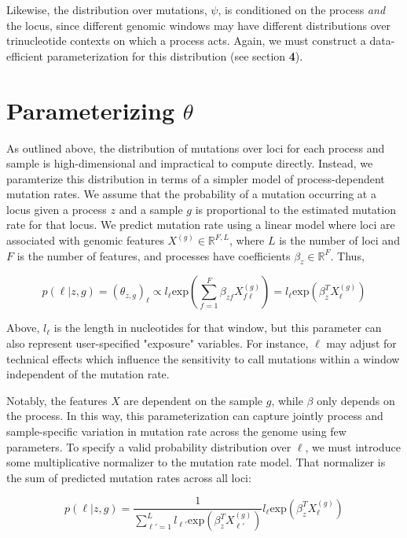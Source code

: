 \documentclass{article}
\begin{document}
Likewise, the distribution over mutations, $\psi$, is conditioned on the process \emph{and} the locus, since different genomic windows may have different 
distributions over trinucleotide contexts on which a process acts. Again, we must construct a data-efficient parameterization for this distribution (see section \textbf{4}).


\section{Parameterizing $\theta$}

As outlined above, the distribution of mutations over loci for each process and sample is high-dimensional and impractical to compute directly. Instead, we paramterize this
distribution in terms of a simpler model of process-dependent mutation rates. We assume that the probability of a mutation occurring at a locus given a process $z$ and a sample $g$ is proportional to the estimated mutation rate for that locus. We predict mutation rate using a linear model where loci are associated with genomic features $X^{(g)} \in \mathbb{R}^{F,L}$, where $L$ is the number of loci and $F$ is the number of features, and processes have coefficients $\beta_z \in \mathbb{R}^{F}$. Thus, 

\begin{equation} \label{3}
p(\ell | z, g) = (\theta_{z,g})_\ell \propto l_\ell  \textrm{exp}(\sum_{f=1}^{F}\beta_{zf} X^{(g)}_{f\ell}) = l_\ell \textrm{exp}(\beta_z^T X^{(g)}_\ell)
\end{equation}

Above, $l_\ell$ is the length in nucleotides for that window, but this parameter can also represent user-specified "exposure" variables. For instance, $\ell$ may adjust for technical effects which influence the sensitivity to call mutations within a window independent of the mutation rate.

Notably, the features $X$ are dependent on the sample $g$, while $\beta$ only depends on the process. In this way, this parameterization can capture jointly process and sample-specific variation in mutation rate across the genome using few parameters. To specify a valid probability distribution over $\ell$, we must introduce some multiplicative normalizer to the mutation rate model. That normalizer is the sum of predicted mutation rates across all loci:

\begin{equation}
p(\ell | z, g) = \frac{1}{\sum_{\ell'=1}^L l_{\ell'} \textrm{exp}(\beta_z^T X^{(g)}_{\ell'})} l_\ell \textrm{exp}(\beta_z^T X^{(g)}_\ell)
\end{equation}
\end{document}
